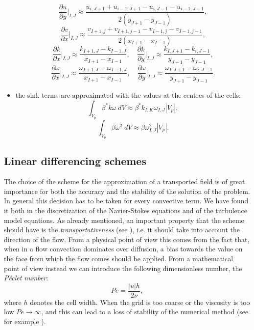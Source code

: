 \begin{itemize}
	\begin{equation}
	\frac{\partial u}{\partial y}\Big|_{I,J} \approx 
	\frac{u_{i,J+1}+u_{i-1,J+1}-u_{i,J-1}-u_{i-1,J-1}}{2(y_{J+1}-y_{J-1})},
	\end{equation}
	\begin{equation}
	\frac{\partial v}{\partial x} \Big|_{I,J} \approx 
	\frac{v_{I+1,j}+v_{I+1,j-1}-v_{I-1,j}-v_{I-1,j-1}}{2(x_{I+1}-x_{I-1})},
	\end{equation}
	\begin{equation}
	\frac{\partial k}{\partial x}\Big|_{I,J} \approx \frac{k_{I+1,J} - 
		k_{I-1,J}}{x_{I+1} - x_{I-1}}, 
	\quad \frac{\partial k}{\partial y}\Big|_{I,J} \approx 
	\frac{k_{I,J+1}-k_{i,J-1}}{y_{J+1}-y_{J-1}},
	\end{equation}
	\begin{equation}
	\frac{\partial \omega}{\partial x}\Big|_{I,J} \approx 
	\frac{\omega_{I+1,J} - \omega_{I-1,J}}{x_{I+1} - x_{I-1}}, \quad 
	\frac{\partial \omega}{\partial y}\Big|_{I,J} \approx 
	\frac{\omega_{I,J+1}-\omega_{i,J-1}}{y_{J+1}-y_{J-1}}.
	\end{equation}
	\item the sink terms are approximated with the values at the centres of the 
	cells:
	\begin{equation}
	\int_{V_p} \beta^* k \omega \; dV \approx 
	\beta^*k_{I,K}\omega_{I,J}|V_p|,
	\end{equation}
	\begin{equation}
	\int_{V_p} \beta \omega^2 \; dV \approx \beta \omega_{I,J}^2 |V_p|.
	\end{equation}
\end{itemize}
%
\subsection{Linear differencing schemes} \label{subsec:diffscheme}
The choice of the scheme for the approximation of a transported field is of 
great importance for both the accuracy and the stability of the solution of the 
problem. In general this decision has to be taken for every convective term. We have found it both in the discretization of the Navier-Stokes equations
and of the turbulence model equations. As already mentioned, an 
important property that the scheme should have is the \emph{transportativeness} 
(see \cite{main:vermal}), i.e. it should take into account the direction of the 
flow. From a physical point of view this comes from the fact that, when
in a flow convection dominates over diffusion,
a bias towards the value on the face from which the flow comes should be applied.
From a mathematical 
point of view instead we can introduce the following dimensionless number, the \emph{Péclet number}:
\begin{equation}
	Pe = \frac{|u| h}{2\nu},
\end{equation}
where $h$ denotes the cell width. When the grid is too coarse or the viscosity 
is too low $Pe\rightarrow\infty$, and this can lead to a loss of stability of 
the numerical method (see for example \cite{main:quarteroni}).

